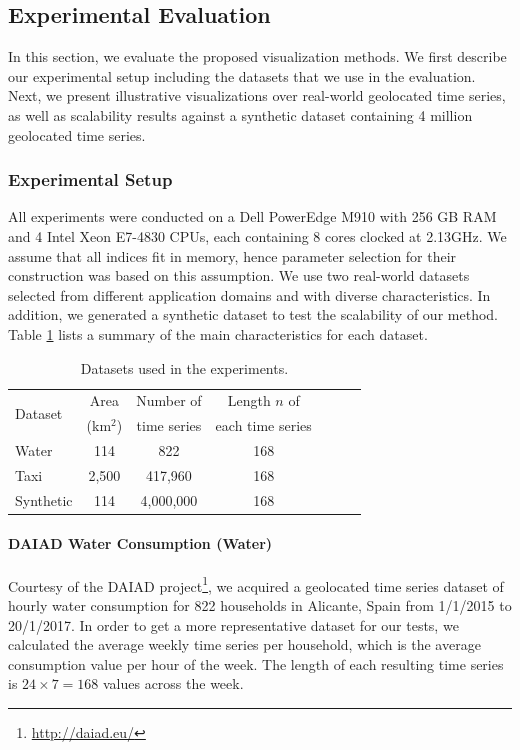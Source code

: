 \subsection{Experimental Evaluation}
\label{sec:evaluation}

In this section, we evaluate the proposed visualization methods. We first describe our experimental setup including the datasets that we use in the evaluation. Next, we present illustrative visualizations over real-world geolocated time series, as well as scalability results against a synthetic dataset containing 4 million geolocated time series.

\subsubsection{Experimental Setup}
\label{subsec:exp_setup}

All experiments were conducted on a Dell PowerEdge M910 with 256 GB RAM and 4 Intel Xeon E7-4830 CPUs, each containing 8 cores clocked at 2.13GHz. We assume that all indices fit in memory, hence parameter selection for their construction was based on this assumption. We use two real-world datasets selected from different application domains and with diverse characteristics. In addition, we generated a synthetic dataset to test the scalability of our method. Table \ref{tab:datasets} lists a summary of the main characteristics for each dataset.

\begin{table}[h]
	\centering
	\caption{Datasets used in the experiments.}
	\begin{small}
	\centering
	\begin{tabular}{lcccccc}
	\hline
	\multirow{2}{*}{Dataset} & Area & Number of & Length $n$ of \\
	 & (km$^2$) & time series & each time series \\
	\hline
	Water & 114 & 822 & 168 \\
	Taxi & 2,500 & 417,960 & 168 \\
	Synthetic & 114 & 4,000,000 & 168 \\
	\hline
	\end{tabular}
	\end{small}
	\label{tab:datasets}
\end{table}
\vspace{-7.5pt}

\paragraph{DAIAD Water Consumption (Water)} Courtesy of the DAIAD project\footnote{\url{http://daiad.eu/}}, we acquired a geolocated time series dataset of hourly water consumption for 822 households in Alicante, Spain from 1/1/2015 to 20/1/2017. In order to get a more representative dataset for our tests, we calculated the average weekly time series per household, which is the average consumption value per hour of the week. The length of each resulting time series is $24 \times 7=168$ values across the week.

